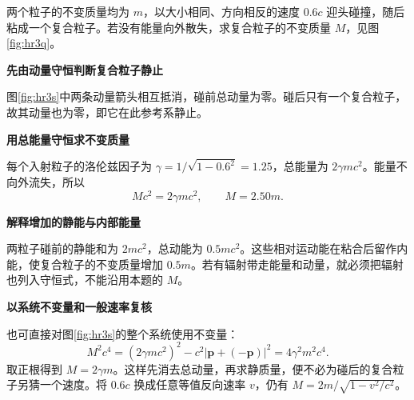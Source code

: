 \begin{question}
\begin{example}[迎头粘合后的质量]\label{ex:hr3}
两个粒子的不变质量均为 $m$，以大小相同、方向相反的速度 $0.6c$ 迎头碰撞，随后粘成一个复合粒子。若没有能量向外散失，求复合粒子的不变质量 $M$，见图\ref{fig:hr3q}。
\end{example}
\end{question}

\begin{solution}\textbf{先由动量守恒判断复合粒子静止}\par\nobreak
图\ref{fig:hr3s}中两条动量箭头相互抵消，碰前总动量为零。碰后只有一个复合粒子，故其动量也为零，即它在此参考系静止。



\par\medskip{}\noindent\textbf{用总能量守恒求不变质量}\par\nobreak
每个入射粒子的洛伦兹因子为 $\gamma=1/\sqrt{1-0.6^2}=1.25$，总能量为 $2\gamma mc^2$。能量不向外流失，所以
\[
Mc^2=2\gamma mc^2,\qquad \boxed{M=2.50m}.
\]



\par\medskip{}\noindent\textbf{解释增加的静能与内部能量}\par\nobreak
两粒子碰前的静能和为 $2mc^2$，总动能为 $0.5mc^2$。这些相对运动能在粘合后留作内能，使复合粒子的不变质量增加 $0.5m$。若有辐射带走能量和动量，就必须把辐射也列入守恒式，不能沿用本题的 $M$。



\par\medskip{}\noindent\textbf{以系统不变量和一般速率复核}\par\nobreak
也可直接对图\ref{fig:hr3s}的整个系统使用不变量：
\[
M^2c^4=(2\gamma mc^2)^2-c^2|\bm p+(-\bm p)|^2
=4\gamma^2m^2c^4.
\]
取正根得到 $M=2\gamma m$。这样先消去总动量，再求静质量，便不必为碰后的复合粒子另猜一个速度。将 $0.6c$ 换成任意等值反向速率 $v$，仍有 $M=2m/\sqrt{1-v^2/c^2}$。
\end{solution}

